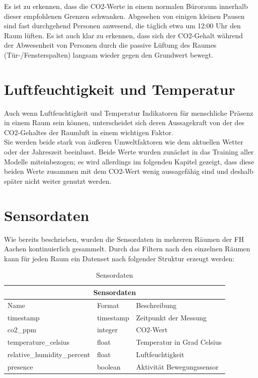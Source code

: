 Es ist zu erkennen, dass die CO2-Werte in einem normalen Büroraum innerhalb dieser empfohlenen Grenzen schwanken.
Abgesehen von einigen kleinen Pausen sind fast durchgehend Personen anwesend, die täglich etwa um 12:00 Uhr den 
Raum lüften.
Es ist auch klar zu erkennen, dass sich der CO2-Gehalt während der Abwesenheit von Personen durch die passive
Lüftung des Raumes (Tür-/Fensterspalten) langsam wieder gegen den Grundwert bewegt.

\newpage
\section{Luftfeuchtigkeit und Temperatur}
Auch wenn Luftfeuchtigkeit und Temperatur Indikatoren für menschliche Präsenz in einem Raum sein können, 
unterscheidet sich deren Aussagekraft von der des CO2-Gehaltes der Raumluft in einem wichtigen Faktor.\\ 
Sie werden beide stark von äußeren Umweltfaktoren wie dem aktuellen Wetter oder der Jahreszeit beeinlusst.
Beide Werte wurden zunächst in das Training aller Modelle miteinbezogen; es wird allerdings im folgenden 
Kapitel gezeigt, dass diese beiden Werte zusammen mit dem CO2-Wert wenig aussagefähig sind und 
deshalb später nicht weiter genutzt werden.  

\section{Sensordaten}
Wie bereits beschrieben, wurden die Sensordaten in mehreren Räumen der FH Aachen kontinuierlich 
gesammelt. Durch das Filtern nach den einzelnen Räumen kann für jeden Raum ein Datenset nach folgender Struktur
erzeugt werden:\\

\begin{table}[ht]
    \caption{Sensordaten}
    \centering
    \begin{tabular}{|p{4.5cm}||p{3cm}|p{5.5cm}|}
        \hline
        \multicolumn{3}{|c|}{Sensordaten} \\
        \hline
        Name&Format &Beschreibung\\
        \hline
        timestamp&timestamp&Zeitpunkt der Messung\\
        co2\_ppm&integer&CO2-Wert\\
        temperature\_celsius&float&Temperatur in Grad Celsius\\
        relative\_humidity\_percent&float&Luftfeuchtigkeit\\
        presence&boolean&Aktivität Bewegungssensor\\
        \hline
    \end{tabular}             
\end{table}

